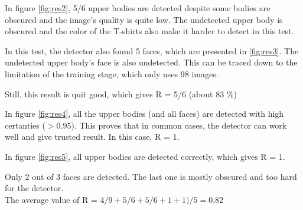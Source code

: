 In figure \ref{fig:res2}, 5/6 upper bodies are detected despite some bodies are obscured and the image's quality is quite low. The undetected upper body is obscured and the color of the T-shirts also make it harder to detect in this test.

%	

In this test, the detector also found 5 faces, which are presented in \ref{fig:res3}. The undetected upper body's face is also undetected. This can be traced down to the limitation of the training stage, which only uses 98 images.

Still, this result is quit good, which gives R = 5/6 (about 83 \%)

In figure \ref{fig:res4}, all the upper bodies (and all faces) are detected with high certanties (\(> 0.95\)). This proves that in common cases, the detector can work well and give trusted result.
In this case, R = 1.

In figure \ref{fig:res5}, all upper bodies are detected correctly, which gives R = 1.

Only 2 out of 3 faces are detected. The last one is mostly obscured and too hard for the detector. \\
The average value of R = \(4/9 + 5/6 + 5/6 + 1 + 1) / 5 = 0.82\) \\
